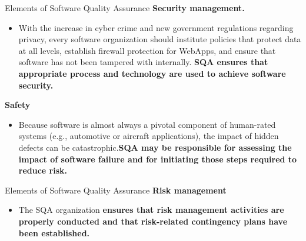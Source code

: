 \documentclass{beamer}
\begin{document}
\begin{frame}{Elements of Software Quality Assurance}
	\textbf{Security management.}
	\begin{itemize}
		\item With the increase in cyber crime and new government regulations regarding privacy, every software organization should institute policies that protect data at all levels, establish firewall protection for WebApps, and ensure that software has not been tampered with internally. \textbf{SQA ensures that appropriate process and technology are used to achieve software security.}
	\end{itemize}
	\textbf{Safety}
	\begin{itemize}
		\item Because software is almost always a pivotal component of human-rated systems (e.g., automotive or aircraft applications), the impact of hidden defects can be catastrophic.\textbf{SQA may be responsible for assessing the impact of software failure and for initiating those steps required to reduce risk.}
	\end{itemize}
\end{frame}
\begin{frame}{Elements of Software Quality Assurance}
	\textbf{Risk management}
	\begin{itemize}
		\item The SQA organization \textbf{ensures that risk management activities are properly conducted and that risk-related contingency plans have been established.}
	\end{itemize}
\end{frame}
\end{document}
